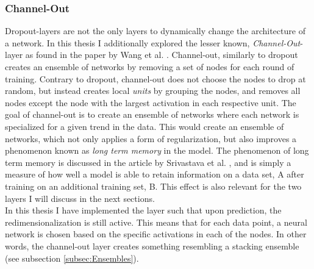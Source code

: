 \subsubsection*{Channel-Out}\label{subsubsec:Channel-Out}
Dropout-layers are not the only layers to dynamically change the architecture of a network. In this thesis I additionally 
explored the lesser known, \emph{Channel-Out}-layer as found in the paper by Wang et al. \cite{wang_maxout_2013}. 
Channel-out, similarly to dropout creates an ensemble of networks by removing a set 
of nodes for each round of training. Contrary to dropout, channel-out does not choose the nodes to drop at random,
but instead creates local \emph{units} by grouping the nodes, and removes all nodes except the node with the largest
activation in each respective unit. The goal of channel-out is to create an ensemble of networks where each network is specialized for a given 
trend in the data. This would create an ensemble of networks, which not only applies a form of regularization, but also improves a phenomenon
known as \emph{long term memory} in the model. The phenomenon of long term memory is discussed in the article by Srivastava et al. \cite{srivastava_compete_2013},
and is simply a measure of how well a model is able to retain information on a data set, A after training on an additional training set, B. This effect
is also relevant for the two layers I will discuss in the next sections.\\
In this thesis I have implemented the layer such that upon prediction, the redimensionalization 
is still active. This means that for each data point, a neural network is chosen based on the specific activations in 
each of the nodes. In other words, the channel-out layer creates something resembling a stacking ensemble (see subsection 
\ref{subsec:Ensembles}). 
